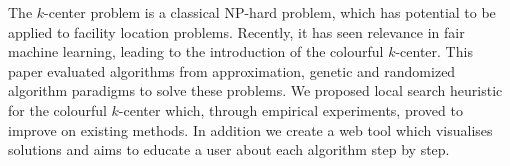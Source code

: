 The $k$-center problem is a classical NP-hard problem, which has potential to be applied to facility location problems. Recently, it has seen relevance in fair machine learning, leading to the introduction of the colourful $k$-center. This paper evaluated algorithms from approximation, genetic and randomized algorithm paradigms to solve these problems. We proposed local search heuristic for the colourful $k$-center which, through empirical experiments, proved to improve on existing methods. In addition we create a web tool which visualises solutions and aims to educate a user about each algorithm step by step.